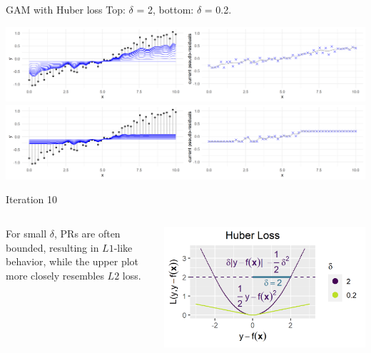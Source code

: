 \documentclass[11pt,compress,t,notes=noshow, xcolor=table]{beamer}
\begin{document}
\begin{frame}{GAM with Huber loss}
Top: $\delta$ = 2, bottom: $\delta$ = 0.2.

\vfill

\includegraphics[width=\textwidth]{figure/illustration_gaussian_huber_2_10.png}
\includegraphics[width=\textwidth]{figure/illustration_gaussian_huber_02_10.png}

\vfill

Iteration 10


\footnotesize
\begin{columns}[c]
\begin{column}{0.75\textwidth}
For small $\delta$, PRs are often
bounded, resulting in $L1$-like behavior, while the upper plot more closely 
resembles $L2$ loss.
\end{column}
\begin{column}{0.24\textwidth}
\includegraphics[width=1.2\textwidth]{figure/fig-loss-huber-delta.png}
\end{column}
\end{columns}

\end{frame}
\end{document}
